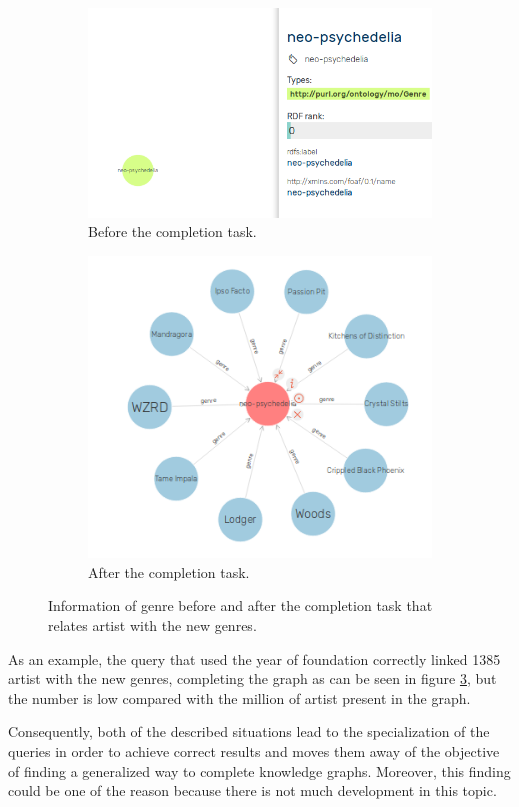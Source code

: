 \begin{figure}[!tbh]
	\centering
	\begin{subfigure}{0.49\columnwidth}
		\centering
		\includegraphics[width=0.7\linewidth]{images/neo-psychedelia.png}
		\caption{Before the completion task.}
		\label{subfig:before}
	\end{subfigure}
	\begin{subfigure}{0.49\columnwidth}
		\centering
		\includegraphics[width=0.63\linewidth]{images/neo-after.png}
		\caption{After the completion task.}
		\label{subfig:after}
	\end{subfigure}
	\caption{Information of genre before and after the completion task that relates artist with the new genres.}
	\label{fig:completion}
\end{figure}

As an example, the query that used the year of foundation correctly linked 1385 artist with the new genres, completing the graph as can be seen in figure \ref{fig:completion}, but the number is low compared with the million of artist present in the graph. 

Consequently, both of the described situations lead to the specialization of the queries in order to achieve correct results and moves them away of the objective of finding a generalized way to complete knowledge graphs. Moreover, this finding could be one of the reason because there is not much development in this topic. 